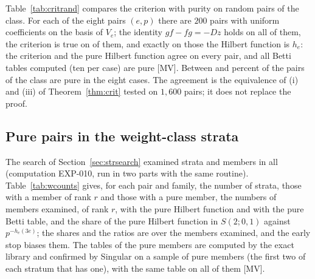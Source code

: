 \documentclass[11pt]{article}
\theoremstyle{definition}
\theoremstyle{remark}
\newcommand{\EXP}[1]{\mbox{EXP-#1}}
\newcommand{\F}{\mathbb{F}}
\begin{document}
\begin{table}[htbp]
\centering\footnotesize

\caption{The explicit pairs of Corollary~\ref{cor:cases} that were computed (cases B, C, D): the case, $(e,p)$, the type, the forms over $\F_p$ and the length of $U/(Uf+Ug)$ (equal to $e^3$); each has $gf-fg=-Dz$, a zero dimensional ideal $(zD,n(f),n(g))$, the Hilbert function $h_e$ and the Betti table $(1,2,2,1)$ on $(0,e,3e,4e)$ in both instruments.}
\label{tab:critpairs}
\end{table}

Table~\ref{tab:critrand} compares the criterion with purity on random pairs of the class. For each of the eight pairs $(e,p)$ there are $200$ pairs with uniform coefficients on the basis of $V_e$; the identity $gf-fg=-Dz$ holds on all \ncritRandomPairs{} of them, the criterion is true on \ncritRandomPure{} of them, and exactly on those the Hilbert function is $h_e$: the criterion and the pure Hilbert function agree on every pair, and all \ncritRandomBetti{} Betti tables computed (ten per case) are pure [MV]. Between \ncritShareMin{} and \ncritShareMax{} percent of the pairs of the class are pure in the eight cases. The agreement is the equivalence of (i) and (iii) of Theorem~\ref{thm:crit} tested on $1{,}600$ pairs; it does not replace the proof.

\begin{table}[htbp]
\centering\footnotesize

\caption{Random pairs of the class $V_e$ over $\F_p$: for each $(e,p)$ the seed, the number of pairs, the pairs on which $gf-fg=-Dz$ holds, on which the criterion of Theorem~\ref{thm:crit} is true, with the pure Hilbert function $h_e$, on which exactly one of the two holds, the Betti tables computed (the first ten pairs with the pure Hilbert function) that are pure, and the share of pure pairs in percent.}
\label{tab:critrand}
\end{table}

\subsection{Pure pairs in the weight-class strata}
\label{sec:resstrata}

The search of Section~\ref{sec:strsearch} examined \nwcStrata{} strata and \nwcMembers{} members in all (computation \EXP{010}, run in two parts with the same routine). Table~\ref{tab:wcounts} gives, for each pair and family, the number of strata, those with a member of rank $r$ and those with a pure member, the numbers of members examined, of rank $r$, with the pure Hilbert function and with the pure Betti table, and the share of the pure Hilbert function in $S(2;0,1)$ against $p^{-h_e(3e)}$; the shares and the ratios are over the members examined, and the early stop biases them. The tables of the pure members are computed by the exact library and confirmed by Singular on a sample of \nwcSingular{} pure members (the first two of each stratum that has one), with the same table on all of them [MV].
\end{document}
